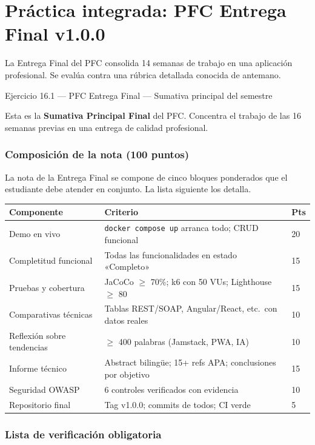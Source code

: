 \documentclass[11pt,a4paper,openany]{book}
\begin{document}
\section{Práctica integrada: PFC Entrega Final v1.0.0}

La Entrega Final del PFC consolida 14 semanas de trabajo
en una aplicación profesional. Se evalúa contra una rúbrica
detallada conocida de antemano.


\begin{cajaejercicio}{Ejercicio 16.1 --- PFC Entrega Final --- Sumativa principal del semestre}

Esta es la \textbf{Sumativa Principal Final} del PFC. Concentra el
trabajo de las 16 semanas previas en una entrega de calidad
profesional.

\subsubsection*{Composición de la nota (100 puntos)}

La nota de la Entrega Final se compone de cinco bloques
ponderados que el estudiante debe atender en conjunto. La lista
siguiente los detalla.


\begin{tabularx}{\textwidth}{lXl}
\toprule
\textbf{Componente} & \textbf{Criterio} & \textbf{Pts}\\
\midrule
Demo en vivo & \texttt{docker compose up} arranca todo; CRUD funcional & 20 \\
Completitud funcional & Todas las funcionalidades en estado «Completo» & 15 \\
Pruebas y cobertura & JaCoCo $\geq$ 70\%; k6 con 50 VUs; Lighthouse $\geq$ 80 & 15 \\
Comparativas técnicas & Tablas REST/SOAP, Angular/React, etc.\ con datos reales & 10 \\
Reflexión sobre tendencias & $\geq$ 400 palabras (Jamstack, PWA, IA) & 10 \\
Informe técnico & Abstract bilingüe; 15+ refs APA; conclusiones por objetivo & 15 \\
Seguridad OWASP & 6 controles verificados con evidencia & 10 \\
Repositorio final & Tag v1.0.0; commits de todos; CI verde & 5 \\
\bottomrule
\end{tabularx}

\subsubsection*{Lista de verificación obligatoria}


\end{cajaejercicio}
\end{document}
